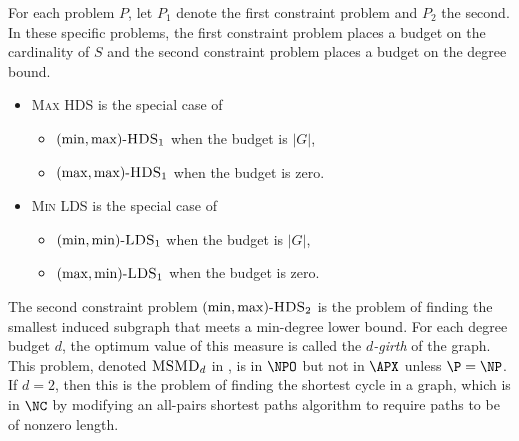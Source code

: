 \documentclass{article}
\newcommand{\dash}{\textnormal{-}}
\begin{document}
For each problem $P$, let $P_1$ denote the first constraint problem and $P_2$ the second.
In these specific problems, the first constraint problem places a budget on the cardinality of $S$ and the second constraint problem places a budget on the degree bound.

\begin{itemize}
\item \textsc{Max HDS} is the special case of
  \begin{itemize}
  \item $(\min, \max)\dash\textsc{HDS}_1$ when the budget is $|G|$,
  \item $(\max, \max)\dash\textsc{HDS}_1$ when the budget is zero.
  \end{itemize}
\item \textsc{Min LDS} is the special case of
  \begin{itemize}
  \item $(\min, \min)\dash\textsc{LDS}_1$ when the budget is $|G|$,
  \item $(\max, \min)\dash\textsc{LDS}_1$ when the budget is zero.
  \end{itemize}
\end{itemize}


The second constraint problem $(\min, \max)\dash\textsc{HDS}_2$ is the problem of finding the smallest induced subgraph that meets a min-degree lower bound.
For each degree budget $d$, the optimum value of this measure is called the \emph{$d$-girth} of the graph.
This problem, denoted $\textsc{MSMD}_d$ in \autocite{appss08}, is in $\NPO$ but not in $\APX$ unless $\P = \NP$.
If $d = 2$, then this is the problem of finding the shortest cycle in a graph, which is in $\NC$ by modifying an all-pairs shortest paths algorithm to require paths to be of nonzero length.
\end{document}
